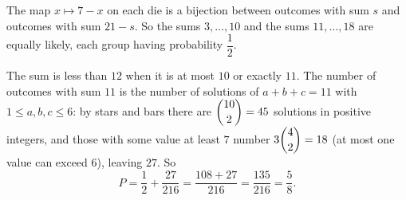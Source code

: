 The map $x\mapsto7-x$ on each die is a bijection between outcomes with sum $s$ and outcomes with sum $21-s$. So the sums $3,\dots,10$ and the sums $11,\dots,18$ are equally likely, each group having probability $\dfrac{1}{2}$.

The sum is less than $12$ when it is at most $10$ or exactly $11$. The number of outcomes with sum $11$ is the number of solutions of $a+b+c=11$ with $1\le a,b,c\le6$: by stars and bars there are $\dbinom{10}{2}=45$ solutions in positive integers, and those with some value at least $7$ number $3\dbinom{4}{2}=18$ (at most one value can exceed $6$), leaving $27$. So
\[
P=\dfrac{1}{2}+\dfrac{27}{216}=\dfrac{108+27}{216}=\dfrac{135}{216}=\boxed{\dfrac{5}{8}} .
\]
